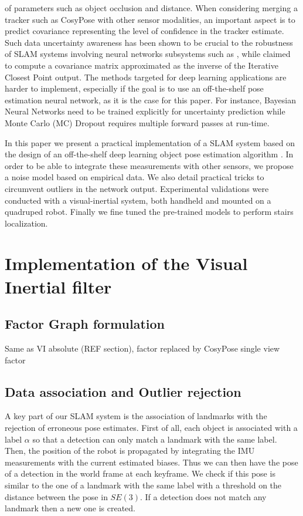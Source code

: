 of parameters such as object occlusion and distance. 
When considering merging a tracker such as CosyPose with other sensor modalities, an important aspect is to predict covariance representing the level of confidence in 
the tracker estimate.
Such data uncertainty awareness has been shown to be crucial to the robustness of SLAM systems involving neural networks subsystems such as \cite{yang2020d3vo}, 
while \cite{SalasMoreno2013SLAMSL} claimed to compute a covariance matrix approximated as the inverse of the Iterative Closest Point output. The methods targeted for 
deep learning applications are harder to implement, especially if the goal is to use an off-the-shelf pose estimation neural network, as it is the case for this paper. 
For instance, Bayesian Neural Networks \cite{jospin2020hands} need to be trained explicitly for uncertainty prediction while Monte Carlo (MC) Dropout \cite{gal2016dropout} 
requires multiple forward passes at run-time.

In this paper we present a practical implementation of a SLAM system based on the design of an off-the-shelf deep learning object pose estimation algorithm \cite{labbe2020cosypose}. 
In order to be able to integrate these measurements with other sensors, we propose a noise model based on empirical data. We also detail practical tricks to circumvent outliers in 
the network output. Experimental validations were conducted with a visual-inertial system, both handheld and mounted on a quadruped robot. Finally we fine tuned the pre-trained models 
to perform stairs localization. 



\section{Implementation of the Visual Inertial filter}

\subsection{Factor Graph formulation}
Same as \apriltag VI absolute (REF section), \apriltag factor replaced by CosyPose single view factor

\subsection{Data association and Outlier rejection}
A key part of our SLAM system is the association of landmarks with the rejection of erroneous pose estimates. First of all, each object is associated with a 
label $\alpha$ so that a detection can only match a landmark with the same label. Then, the position of the robot is propagated by integrating the IMU measurements 
with the current estimated biases. Thus we can then have the pose of a detection in the world frame at each keyframe. We check if this pose is similar to the one of a 
landmark with the same label with a threshold on the distance between the pose in $SE(3)$. If a detection does not match any landmark then a new one is created.


